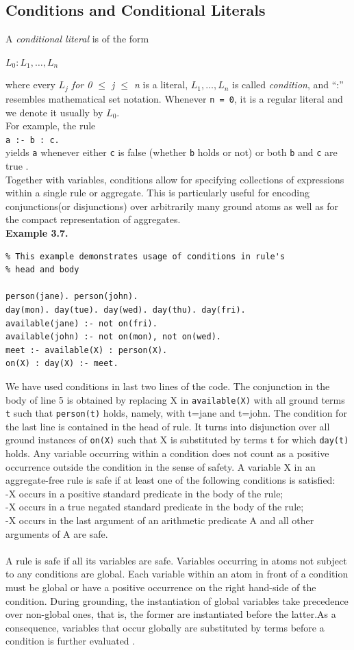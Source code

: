 \documentclass[14pt,a4paper, titlepage]{article}
\begin{document}
\subsection{Conditions and Conditional Literals}
A \textit{conditional literal} is of the form \\ \centerline{$L_0:L_1,\dots,L_n$} where every \textit{$L_j$ for 0 $\leq$ j $\leq$ n} is a literal, $L_1,\dots,L_n$ is called \textit{condition}, and \enquote{:} resembles mathematical set notation. Whenever \texttt{n = 0}, it is a regular literal and we denote it usually by $L_0$.
\\For example, the rule \\ \texttt{a :- b : c.} \\yields \texttt{a} whenever either \texttt{c} is false (whether \texttt{b} holds or not) or both \texttt{b} and \texttt{c} are true \cite{pott}. \\Together  with variables, conditions allow for specifying collections of expressions within a single rule or aggregate. This is particularly useful for encoding conjunctions(or disjunctions) over arbitrarily many ground atoms as well as for the compact representation of aggregates. 
\\ \textbf{Example 3.7.}
\begin{lstlisting}
% This example demonstrates usage of conditions in rule's 
% head and body

person(jane). person(john).
day(mon). day(tue). day(wed). day(thu). day(fri).
available(jane) :- not on(fri).
available(john) :- not on(mon), not on(wed).
meet :- available(X) : person(X).
on(X) : day(X) :- meet.
\end{lstlisting}  
We have used conditions in last two lines of the code. The conjunction in the body of line 5 is obtained by replacing X in \texttt{available(X)} with all ground terms \texttt{t} such that \texttt{person(t)} holds, namely, with t=jane and t=john. The condition for the last line is contained in the head of rule. It turns into disjunction over all ground instances of \texttt{on(X)} such that X is substituted by terms t for which \texttt{day(t)} holds. Any variable occurring within a condition does not count as a positive occurrence outside the condition in the sense of safety. A variable X in an aggregate-free rule is safe if at least one of the following conditions is satisfied:\\-X occurs in a positive standard predicate in the body of the rule;\\-X occurs in a true negated standard predicate in the body of the rule;\\-X occurs in the last argument of an arithmetic predicate A and all other arguments of A are safe. \\ \\A rule is safe if all its variables are safe. Variables occurring in atoms not subject to any conditions are global. Each variable within an atom in front of a condition must be global or have a positive occurrence on the right hand-side of the condition. During grounding, the instantiation of global variables take precedence over non-global ones, that is, the former are instantiated before the latter.As a consequence, variables that occur globally are substituted by terms before a condition is further evaluated \cite{pott}.    
\end{document}

